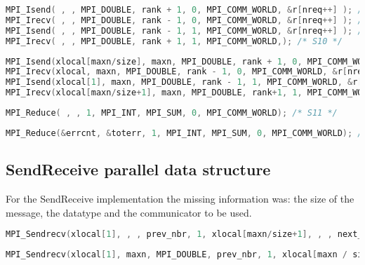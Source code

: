 \documentclass[a4paper, 10pt]{article}
\begin{document}
    \begin{lstlisting}[language=c, caption={Template S7, S8, S9, S10}]
MPI_Isend( , , MPI_DOUBLE, rank + 1, 0, MPI_COMM_WORLD, &r[nreq++] ); /* S7 */
MPI_Irecv( , , MPI_DOUBLE, rank - 1, 0, MPI_COMM_WORLD, &r[nreq++] ); /* S8 */
MPI_Isend( , , MPI_DOUBLE, rank - 1, 1, MPI_COMM_WORLD, &r[nreq++] ); /* S9 */
MPI_Irecv( , , MPI_DOUBLE, rank + 1, 1, MPI_COMM_WORLD,); /* S10 */
    \end{lstlisting}

    \begin{lstlisting}[language=c, caption={Correct S7, S8, S9, S10}]
MPI_Isend(xlocal[maxn/size], maxn, MPI_DOUBLE, rank + 1, 0, MPI_COMM_WORLD, &r[nreq++]); /* S7 */
MPI_Irecv(xlocal, maxn, MPI_DOUBLE, rank - 1, 0, MPI_COMM_WORLD, &r[nreq++]); /* S8 */
MPI_Isend(xlocal[1], maxn, MPI_DOUBLE, rank - 1, 1, MPI_COMM_WORLD, &r[nreq++]); /* S9 */
MPI_Irecv(xlocal[maxn/size+1], maxn, MPI_DOUBLE, rank+1, 1, MPI_COMM_WORLD, &r[nreq++]); /* S10 */
    \end{lstlisting}

    \begin{lstlisting}[language=c, caption={Template S11}]
MPI_Reduce( , , 1, MPI_INT, MPI_SUM, 0, MPI_COMM_WORLD); /* S11 */
    \end{lstlisting}

    \begin{lstlisting}[language=c, caption={Correct S11}]
MPI_Reduce(&errcnt, &toterr, 1, MPI_INT, MPI_SUM, 0, MPI_COMM_WORLD); /* S11 */
    \end{lstlisting}

\subsection{SendReceive parallel data structure}

    For the SendReceive implementation the missing information was: the size of the message, the datatype and the communicator to be used.

    \begin{lstlisting}[language=c, caption={Template S12}]
MPI_Sendrecv(xlocal[1], , , prev_nbr, 1, xlocal[maxn/size+1], , , next_nbr, 1, , status);   /* S12 */
    \end{lstlisting}

    \begin{lstlisting}[language=c, caption={Correct S12}]
MPI_Sendrecv(xlocal[1], maxn, MPI_DOUBLE, prev_nbr, 1, xlocal[maxn / size + 1], maxn, MPI_DOUBLE, next_nbr, 1, MPI_COMM_WORLD, &status); /* S12 */
    \end{lstlisting}
\end{document}
